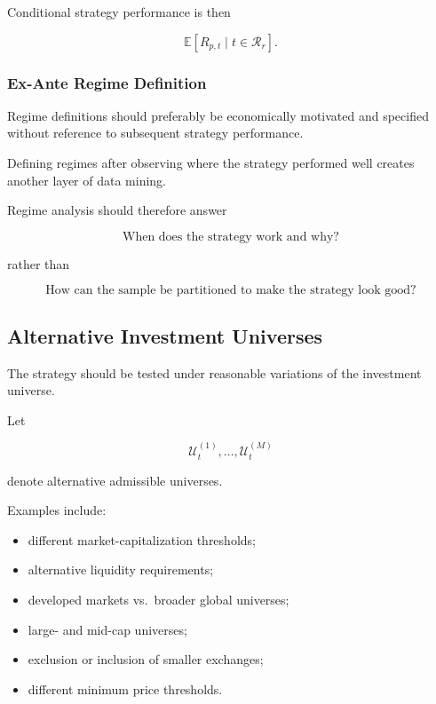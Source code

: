 \documentclass[11pt,a4paper]{article}
\begin{document}
Conditional strategy performance is then

\begin{equation}
\boxed{
\mathbb{E}
\left[
R_{p,t}
\mid
t\in\mathcal{R}_r
\right].
}
\end{equation}


\subsubsection{Ex-Ante Regime Definition}

Regime definitions should preferably be economically motivated and specified
without reference to subsequent strategy performance.

Defining regimes after observing where the strategy performed well creates
another layer of data mining.

Regime analysis should therefore answer

\begin{equation}
\boxed{
\text{When does the strategy work and why?}
}
\end{equation}

rather than

\begin{equation}
\boxed{
\text{How can the sample be partitioned to make the strategy look good?}
}
\end{equation}


\subsection{Alternative Investment Universes}
\label{subsec:alternative_investment_universes}

The strategy should be tested under reasonable variations of the investment
universe.

Let

\begin{equation}
\mathcal{U}_t^{(1)},
\ldots,
\mathcal{U}_t^{(M)}
\end{equation}

denote alternative admissible universes.

Examples include:

\begin{itemize}
    \item different market-capitalization thresholds;
    \item alternative liquidity requirements;
    \item developed markets vs.\ broader global universes;
    \item large- and mid-cap universes;
    \item exclusion or inclusion of smaller exchanges;
    \item different minimum price thresholds.
\end{itemize}
\end{document}
